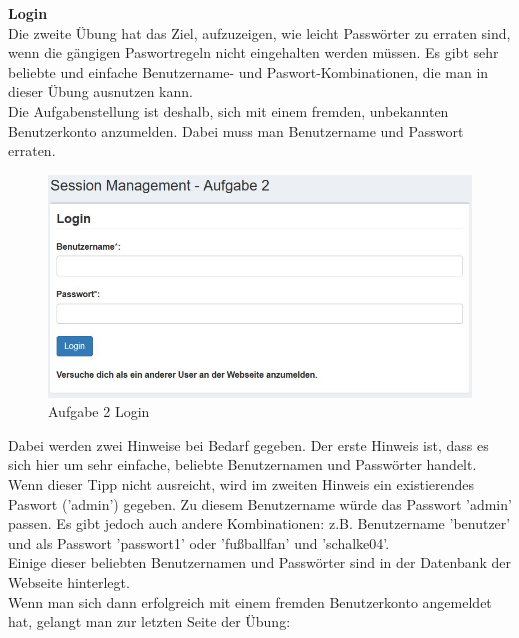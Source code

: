 \textbf{Login}\\
Die zweite Übung hat das Ziel, aufzuzeigen, wie leicht Passwörter zu erraten sind, wenn die gängigen Paswortregeln nicht eingehalten werden müssen. Es gibt sehr beliebte und einfache Benutzername- und Paswort-Kombinationen, die man in dieser Übung ausnutzen kann.\\ 
Die Aufgabenstellung ist deshalb, sich mit einem fremden, unbekannten Benutzerkonto anzumelden. Dabei muss man Benutzername und Passwort erraten. \\
\begin{figure}[H]
	\includegraphics[width=1.0\linewidth]{images/BrokenAuthenticationAndSessionManagement/Login_Start}
	\caption[Login]{Aufgabe 2 Login}
	\label{fig:Aufgabe 2 Login}
\end{figure}
Dabei werden zwei Hinweise bei Bedarf gegeben. Der erste Hinweis ist, dass es sich hier um sehr einfache, beliebte Benutzernamen und Passwörter handelt. Wenn dieser Tipp nicht ausreicht, wird im zweiten Hinweis ein existierendes Paswort ('admin') gegeben. Zu diesem Benutzername würde das Passwort 'admin' passen. Es gibt jedoch auch andere Kombinationen: z.B. Benutzername 'benutzer' und als Passwort 'passwort1' oder 'fußballfan' und 'schalke04'.\\
Einige dieser beliebten Benutzernamen und Passwörter sind in der Datenbank der Webseite hinterlegt.\\
Wenn man sich dann erfolgreich mit einem fremden Benutzerkonto angemeldet hat, gelangt man zur letzten Seite der Übung:
